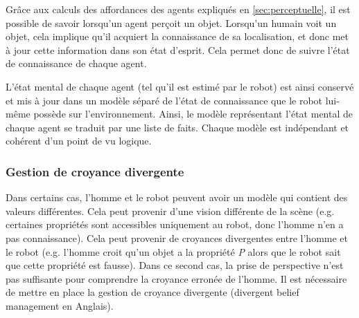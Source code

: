 \documentclass[a4paper,11pt,twoside]{StyleThese}
\begin{document}
Grâce aux calculs des affordances des agents expliqués en \ref{sec:perceptuelle}, il est possible de savoir lorsqu'un agent perçoit un objet. Lorsqu'un humain voit un objet, cela implique qu'il acquiert la connaissance de sa localisation, et donc met à jour cette information dans son état d'esprit. Cela permet donc de suivre l'état de connaissance de chaque agent.

L'état mental de chaque agent (tel qu'il est estimé par le robot) est ainsi conservé et mis à jour dans un modèle séparé de l'état de connaissance que le robot lui-même possède sur l'environnement. Ainsi, le modèle représentant l'état mental de chaque agent se traduit par une liste de faits. Chaque modèle est indépendant et cohérent d'un point de vu logique.





\subsubsection{Gestion de croyance divergente}
\label{sec:divB}
Dans certains cas, l'homme et le robot peuvent avoir un modèle qui contient des valeurs différentes. Cela peut provenir d'une vision différente de la scène (e.g. certaines propriétés sont accessibles uniquement au robot, donc l'homme n'en a pas connaissance).
Cela peut provenir de croyances divergentes entre l'homme et le robot (e.g. l'homme croit qu'un objet a la propriété \textit{P} alors que le robot sait que cette propriété est fausse). Dans ce second cas, la prise de perspective n'est pas suffisante pour comprendre la croyance erronée de l'homme. Il est nécessaire de mettre en place la gestion de croyance divergente (divergent belief management en Anglais).
\end{document}
